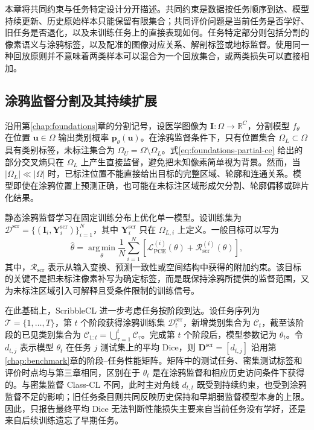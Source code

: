 本章将共同约束与任务特定设计分开描述。共同约束是数据按任务顺序到达、模型持续更新、历史原始样本只能保留有限集合；共同评价问题是当前任务是否学好、旧任务是否退化，以及未训练任务上的直接表现如何。任务特定部分则包括分割的像素语义与涂鸦标签，以及配准的图像对应关系、解剖标签或地标监督。使用同一种回放原则并不意味着两类样本可以混合为一个回放集合，或两类损失可以直接相加。

\subsection{涂鸦监督分割及其持续扩展}
\label{subsec:task-cl-scribble-formulation}

沿用第\ref{chap:foundations}章的分割记号，设医学图像为
$\mathbf{I}:\Omega\rightarrow\mathbb{R}^{C}$，分割模型
$f_{\theta}$ 在位置 $\mathbf{u}\in\Omega$ 输出类别概率
$\mathbf{p}_{\theta}(\mathbf{u})$。在涂鸦监督条件下，只有位置集合
$\Omega_L\subset\Omega$ 具有类别标签，未标注集合为
$\Omega_U=\Omega\setminus\Omega_L$。式\eqref{eq:foundations-partial-ce}
给出的部分交叉熵只在 $\Omega_L$ 上产生直接监督，避免把未知像素简单视为背景。然而，当 $|\Omega_L|\ll|\Omega|$ 时，已标注位置不能直接给出目标的完整区域、轮廓和连通关系。模型即使在涂鸦位置上预测正确，也可能在未标注区域形成欠分割、轮廓偏移或碎片化结果。

静态涂鸦监督学习在固定训练分布上优化单一模型。设训练集为
$\mathcal{D}^{\mathrm{scr}}=\{(\mathbf{I}_i,\mathbf{Y}^{\mathrm{scr}}_i)\}_{i=1}^{N}$，其中
$\mathbf{Y}^{\mathrm{scr}}_i$ 只在 $\Omega_{L,i}$ 上定义。一般目标可以写为
\begin{equation}
\widehat{\theta}
=
\operatorname*{arg\,min}_{\theta}
\frac{1}{N}\sum_{i=1}^{N}
\left[
\mathcal{L}_{\mathrm{PCE}}^{(i)}(\theta)
+
\mathcal{R}_{\mathrm{scr}}^{(i)}(\theta)
\right],
\label{eq:scribble-static-objective}
\end{equation}
其中，$\mathcal{R}_{\mathrm{scr}}$ 表示从输入变换、预测一致性或空间结构中获得的附加约束。该目标的关键不是把未标注像素补写为确定标签，而是既保持涂鸦所提供的监督范围，又为未标注区域引入可解释且受条件限制的训练信号。

在此基础上，ScribbleCL 进一步考虑任务按阶段到达。设任务序列为
$\mathcal{T}=\{1,\ldots,T\}$，第 $t$ 个阶段获得涂鸦训练集
$\mathcal{D}^{\mathrm{scr}}_t$，新增类别集合为 $\mathcal{C}_t$，截至该阶段的已见类别集合为
$\mathcal{C}_{1:t}=\bigcup_{\tau=1}^{t}\mathcal{C}_{\tau}$。完成第 $t$ 个阶段后，模型参数记为 $\theta_t$。令
$d_{t,j}$ 表示模型 $\theta_t$ 在任务 $j$ 测试集上的平均 Dice，则
$\mathbf{D}^{\mathrm{scr}}=[d_{t,j}]$ 沿用第\ref{chap:benchmark}章的阶段--任务性能矩阵。矩阵中的测试任务、密集测试标签和评价时点均与第三章相同，区别在于 $\theta_t$ 是在涂鸦监督和相应历史访问条件下获得的。与密集监督 Class-CL 不同，此时主对角线 $d_{t,t}$ 既受到持续约束，也受到涂鸦监督不足的影响；旧任务条目则共同反映历史保持和早期弱监督模型本身的上限。因此，只报告最终平均 Dice 无法判断性能损失主要来自当前任务没有学好，还是来自后续训练遗忘了早期任务。

